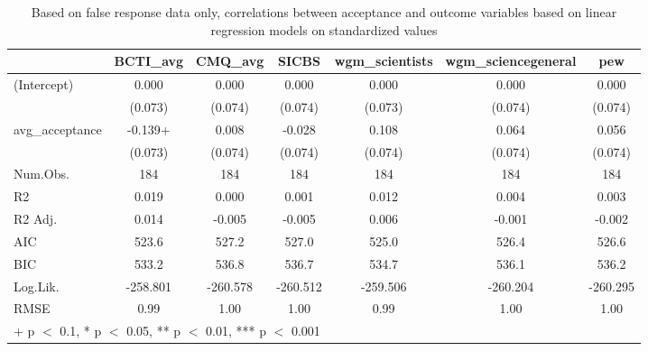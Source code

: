 \documentclass[
  doc,floatsintext]{apa6}
\begin{document}
\begin{table}
\centering
\caption{\label{tab:false-response-regression}Based on false response data only, correlations between acceptance and outcome variables based on linear regression models on standardized values}
\centering
\begin{tabular}[t]{lcccccc}
\toprule
  & BCTI\_avg & CMQ\_avg & SICBS & wgm\_scientists & wgm\_sciencegeneral & pew\\
\midrule
(Intercept) & 0.000 & 0.000 & 0.000 & 0.000 & 0.000 & 0.000\\
 & (0.073) & (0.074) & (0.074) & (0.073) & (0.074) & (0.074)\\
avg\_acceptance & -0.139+ & 0.008 & -0.028 & 0.108 & 0.064 & 0.056\\
 & (0.073) & (0.074) & (0.074) & (0.074) & (0.074) & (0.074)\\
\midrule
Num.Obs. & 184 & 184 & 184 & 184 & 184 & 184\\
R2 & 0.019 & 0.000 & 0.001 & 0.012 & 0.004 & 0.003\\
R2 Adj. & 0.014 & -0.005 & -0.005 & 0.006 & -0.001 & -0.002\\
AIC & 523.6 & 527.2 & 527.0 & 525.0 & 526.4 & 526.6\\
BIC & 533.2 & 536.8 & 536.7 & 534.7 & 536.1 & 536.2\\
Log.Lik. & -258.801 & -260.578 & -260.512 & -259.506 & -260.204 & -260.295\\
RMSE & 0.99 & 1.00 & 1.00 & 0.99 & 1.00 & 1.00\\
\bottomrule
\multicolumn{7}{l}{\rule{0pt}{1em}+ p $<$ 0.1, * p $<$ 0.05, ** p $<$ 0.01, *** p $<$ 0.001}\\
\end{tabular}
\end{table}
\end{document}
